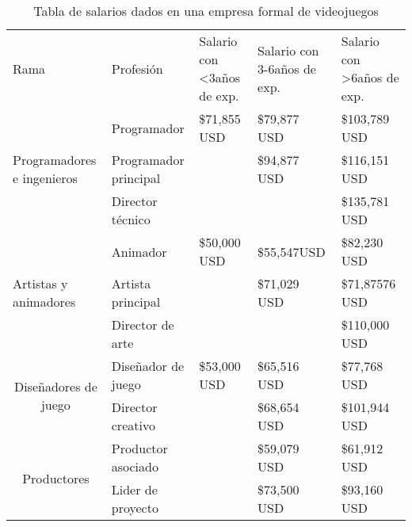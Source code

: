\begin{table}[htbp]
	\centering
	\caption{Tabla de salarios dados en una empresa formal de videojuegos}
	\label{tablacostos}
	\begin{tabular}{lllll}
		Rama                                                      & Profesión                   & Salario con \textless 3años de exp. & Salario con 3-6años de exp. & Salario con \textgreater 6años de exp. \\
		\multirow{3}{*}{Programadores e ingenieros}               & Programador                 & \$71,855 USD                        & \$79,877 USD                & \$103,789 USD                          \\
		& Programador principal       &                                     & \$94,877 USD                & \$116,151 USD                          \\
		& Director técnico            &                                     &                             & \$135,781 USD                          \\
		\multirow{3}{*}{Artistas y animadores}                    & Animador                    & \$50,000 USD                        & \$55,547USD                 & \$82,230 USD                           \\
		& Artista principal           &                                     & \$71,029 USD                & \$71,87576 USD                         \\
		& Director de arte            &                                     &                             & \$110,000 USD                          \\
		\multicolumn{1}{c}{\multirow{2}{*}{Diseñadores de juego}} & Diseñador de juego          & \$53,000 USD                        & \$65,516 USD                & \$77,768 USD                           \\
		\multicolumn{1}{c}{}                                      & Director creativo           &                                     & \$68,654 USD                & \$101,944 USD                          \\
		\multicolumn{1}{c}{\multirow{3}{*}{Productores}}          & Productor asociado          &                                     & \$59,079 USD                & \$61,912 USD                           \\
		\multicolumn{1}{c}{}                                      & Lider de proyecto           &                                     & \$73,500 USD                & \$93,160 USD                           \\

\end{tabular}
\end{table}
